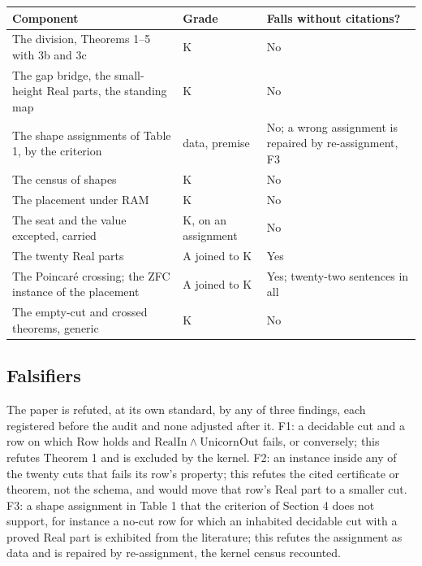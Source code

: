 \documentclass[10pt,twocolumn]{article}
\begin{document}
\begin{table}[!h]
\centering\scriptsize
\renewcommand{\arraystretch}{1.15}
\begin{tabularx}{\columnwidth}{@{}L P{0.19\columnwidth} P{0.22\columnwidth}@{}}
\toprule
\textbf{Component} & \textbf{Grade} & \textbf{Falls without citations?} \\
\midrule
The division, Theorems 1--5 with 3b and 3c & K & No \\
The gap bridge, the small-height Real parts, the standing map & K & No \\
The shape assignments of Table 1, by the criterion & data, premise & No; a wrong assignment is repaired by re-assignment, F3 \\
The census of shapes & K & No \\
The placement under RAM & K & No \\
The seat and the value excepted, carried & K, on an assignment & No \\
The twenty Real parts & A joined to K & Yes \\
The Poincaré crossing; the ZFC instance of the placement & A joined to K & Yes; twenty-two sentences in all \\
The empty-cut and crossed theorems, generic & K & No \\
\bottomrule
\end{tabularx}
\end{table}

\hypertarget{falsifiers}{%
\subsection{Falsifiers}\label{falsifiers}}

The paper is refuted, at its own standard, by any of three findings,
each registered before the audit and none adjusted after it. F1: a
decidable cut and a row on which \(\mathrm{Row}\) holds and
\(\mathrm{RealIn} \wedge \mathrm{UnicornOut}\) fails, or conversely;
this refutes Theorem 1 and is excluded by the kernel. F2: an instance
inside any of the twenty cuts that fails its row's property; this
refutes the cited certificate or theorem, not the schema, and would move
that row's Real part to a smaller cut. F3: a shape assignment in Table 1
that the criterion of Section 4 does not support, for instance a no-cut
row for which an inhabited decidable cut with a proved Real part is
exhibited from the literature; this refutes the assignment as data and
is repaired by re-assignment, the kernel census recounted.
\end{document}
